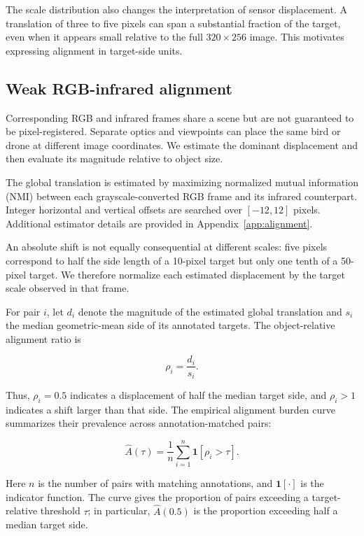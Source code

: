 \documentclass[10pt]{article}
\newcommand{\burden}{\widehat A}
\begin{document}
The scale distribution also changes the interpretation of sensor displacement. A translation of three to five pixels can span a substantial fraction of the target, even when it appears small relative to the full $320\times256$ image. This motivates expressing alignment in target-side units.

\subsection{Weak RGB-infrared alignment}
\label{sec:alignment}

Corresponding RGB and infrared frames share a scene but are not guaranteed to be pixel-registered. Separate optics and viewpoints can place the same bird or drone at different image coordinates. We estimate the dominant displacement and then evaluate its magnitude relative to object size.

The global translation is estimated by maximizing normalized mutual information (NMI) between each grayscale-converted RGB frame and its infrared counterpart. Integer horizontal and vertical offsets are searched over $[-12,12]$ pixels. Additional estimator details are provided in Appendix~\ref{app:alignment}.

An absolute shift is not equally consequential at different scales: five pixels correspond to half the side length of a 10-pixel target but only one tenth of a 50-pixel target. We therefore normalize each estimated displacement by the target scale observed in that frame.

For pair $i$, let $d_i$ denote the magnitude of the estimated global translation and $s_i$ the median geometric-mean side of its annotated targets. The object-relative alignment ratio is

\begin{equation}
\rho_i=\frac{d_i}{s_i}.
\label{eq:rho}
\end{equation}

Thus, $\rho_i=0.5$ indicates a displacement of half the median target side, and $\rho_i>1$ indicates a shift larger than that side. The empirical alignment burden curve summarizes their prevalence across annotation-matched pairs:

\begin{equation}
\burden(\tau)=\frac{1}{n}\sum_{i=1}^{n}\mathbf{1}[\rho_i>\tau].
\label{eq:burden}
\end{equation}

Here $n$ is the number of pairs with matching annotations, and $\mathbf{1}[\cdot]$ is the indicator function. The curve gives the proportion of pairs exceeding a target-relative threshold $\tau$; in particular, $\burden(0.5)$ is the proportion exceeding half a median target side.
\end{document}
